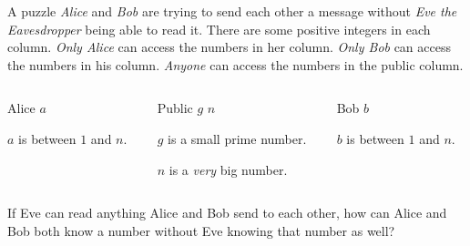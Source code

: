 \begin{frame}{A puzzle}
	\emph{Alice} and \emph{Bob} are trying to send each other a message without \emph{Eve the Eavesdropper} being able to read it.
	\vertspace
	There are some positive integers in each column. \emph{Only Alice} can access the numbers in her column. \emph{Only Bob} can access the numbers in his column. \emph{Anyone} can access the numbers in the \alert{public} column.
	\begin{columns}
		\begin{column}{0.2\textwidth}
			\begin{block}{Alice}
				\centering
				$a$

				$a$ is between $1$ and $n$.
			\end{block}
		\end{column}
		\begin{column}{0.4\textwidth}
			\begin{alertblock}{Public}
				\centering
				$g$ \hspace{2em} $n$

				$g$ is a small prime number.

				$n$ is a \emph{very} big number.
			\end{alertblock}
		\end{column}
		\begin{column}{0.2\textwidth}
			\begin{block}{Bob}
				\centering
				$b$

				$b$ is between $1$ and $n$.
			\end{block}
		\end{column}
	\end{columns}
	If Eve can read anything Alice and Bob send to each other, how can Alice and Bob both know a number without Eve knowing that number as well?
\end{frame}
